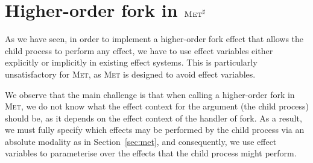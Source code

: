 \documentclass[sigplan, nonacm, natbib = false, review, screen]{acmart}
\newcommand{\Met}{\textsc{Met}\xspace}
\newcommand{\MetHO}{$\Met^\sharp$\xspace}
\begin{document}
%


\section{Higher-order fork in \MetHO}


%

As we have seen, in order to implement a higher-order fork effect that
allows the child process to perform any effect, we have to use effect
variables either explicitly or implicitly in existing effect systems.
%
%
This is particularly unsatisfactory for \textsc{Met}, as \textsc{Met}
is designed to avoid effect variables.

We observe that the main challenge is that when calling a higher-order
fork in \Met, we do not know what the effect context for the argument
(the child process) should be, as it depends on the effect context of
the handler of fork.
%
%
As a result, we must fully specify which effects may be performed by
the child process via an absolute modality as in
Section~\ref{sec:met}, and consequently, we use effect variables to
parameterise over the effects that the child process might perform.
%
\end{document}
